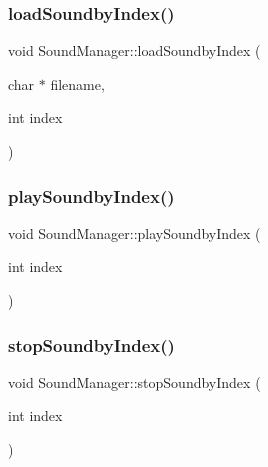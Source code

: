 \hypertarget{class_ori_engine_1_1_sound_manager_a489e924e813bb17f740dfd4605599baa}{}\label{class_ori_engine_1_1_sound_manager_a489e924e813bb17f740dfd4605599baa} 
\subsubsection{\texorpdfstring{load\+Soundby\+Index()}{loadSoundbyIndex()}}
{\footnotesize\ttfamily void Sound\+Manager\+::load\+Soundby\+Index (\begin{DoxyParamCaption}\item[{char $\ast$}]{filename,  }\item[{int}]{index }\end{DoxyParamCaption})}

\hypertarget{class_ori_engine_1_1_sound_manager_add98e983ee46bd07c790503339b87933}{}\label{class_ori_engine_1_1_sound_manager_add98e983ee46bd07c790503339b87933} 
\subsubsection{\texorpdfstring{play\+Soundby\+Index()}{playSoundbyIndex()}}
{\footnotesize\ttfamily void Sound\+Manager\+::play\+Soundby\+Index (\begin{DoxyParamCaption}\item[{int}]{index }\end{DoxyParamCaption})}

\hypertarget{class_ori_engine_1_1_sound_manager_a5492c808a16860c1a04f9ad1309b0b91}{}\label{class_ori_engine_1_1_sound_manager_a5492c808a16860c1a04f9ad1309b0b91} 
\subsubsection{\texorpdfstring{stop\+Soundby\+Index()}{stopSoundbyIndex()}}
{\footnotesize\ttfamily void Sound\+Manager\+::stop\+Soundby\+Index (\begin{DoxyParamCaption}\item[{int}]{index }\end{DoxyParamCaption})}

